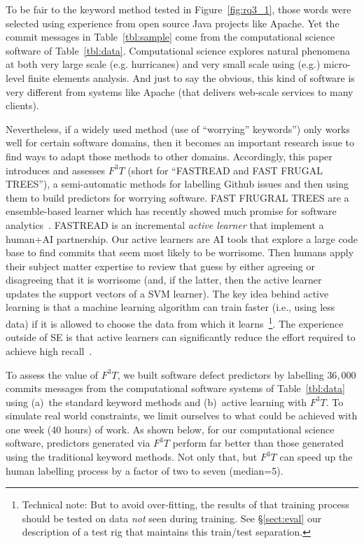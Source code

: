 \documentclass[10pt,conference]{IEEEtran}
\newcommand{\fig}[1]{Figure~\ref{fig:#1}}
\newcommand{\tbl}[1]{Table~\ref{tbl:#1}}
\newcommand{\tion}[1]{\S\ref{sect:#1}}
\begin{document}
To be fair to the keyword method tested in \fig{rq3_1}, those words  were selected  using experience from
 open source Java 
projects like Apache.
Yet  the commit
messages in Table~\ref{tbl:sample} come from
   the computational science software
of \tbl{data}.  
Computational science   explores natural phenomena 
at both very large scale (e.g. hurricanes) and very small scale
using (e.g.) micro-level finite elements analysis.
And just to say the obvious, this kind of software is very different from
systems like Apache (that 
 delivers web-scale services to many   clients).

Nevertheless, if a widely used method (use of ``worrying'' keywords'') only works well for certain software domains,
then it becomes an important research issue to find ways to
adapt those methods to other domains. 
Accordingly, this paper introduces and assesses
$F^3T$
(short for ``FASTREAD and FAST FRUGAL TREES''),
a semi-automatic methods for labelling   Github issues and then using them to build predictors for
worrying software. 
FAST FRUGRAL TREES are a ensemble-based learner which has recently showed
much promise for software analytics~\cite{di18_fft}.
FASTREAD is an incremental 
{\em active learner} that  implement a human+AI partnership. 
Our active learners are AI  tools that
explore a large code base to find commits that seem most likely to be
worrisome. Then humans apply their subject matter expertise  to review that guess by either
agreeing or disagreeing that it is worrisome (and, if the latter, then
the  active
 learner updates  the support vectors of  a SVM learner).
The key idea behind active learning is that a machine learning algorithm can train faster (i.e., using less data) if it is allowed to choose the data from which it learns~\cite{settles2012active}\footnote{Technical note: But to avoid over-fitting, the results
 of that training  process should be tested on data {\em not} seen during  training. See
 \tion{eval} our description of a test rig that maintains this train/test separation. }.
  The experience outside of SE is that  active learners can significantly reduce the  effort required to achieve high recall~\cite{Cormack2017Navigating, Cormack2016Engineering, cormack2016scalability, Cormack2015Autonomy, Cormack2014Evaluation, Wallace2010Semi, wallace2010active, wallace2011should, wallace2012class, nguyen2015combining}. 

To assess the value of  $F^3T$,  we built software
defect predictors by labelling  $36,000$  commits messages from the    computational software
systems of \tbl{data} using (a)~the standard keyword methods and (b)~active learning with $F^3T$.  To simulate real world constraints, we limit ourselves to what could be achieved with one
week (40 hours) of work.
As shown below,   for  our computational  science software,
predictors generated via $F^3T$ perform far better than those generated using the
traditional keyword methods. Not only that, but $F^3T$  can speed up
the human labelling process by a factor of two to seven (median=5). 
\end{document}
